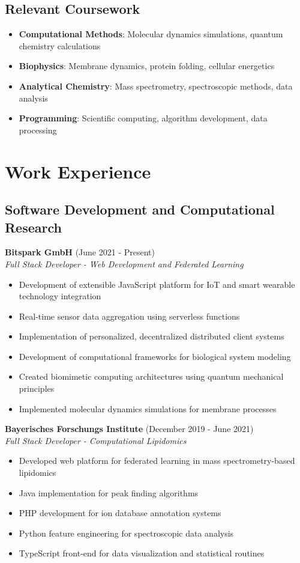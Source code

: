\documentclass[11pt,a4paper]{article}
\begin{document}
\subsection{Relevant Coursework}
\begin{itemize}[leftmargin=*,itemsep=0.1em]
\item \textbf{Computational Methods}: Molecular dynamics simulations, quantum chemistry calculations
\item \textbf{Biophysics}: Membrane dynamics, protein folding, cellular energetics
\item \textbf{Analytical Chemistry}: Mass spectrometry, spectroscopic methods, data analysis
\item \textbf{Programming}: Scientific computing, algorithm development, data processing
\end{itemize}

\section{Work Experience}

\subsection{Software Development and Computational Research}

\textbf{Bitspark GmbH} (June 2021 - Present)\\
\textit{Full Stack Developer - Web Development and Federated Learning}
\begin{itemize}[leftmargin=*,itemsep=0.1em]
\item Development of extensible JavaScript platform for IoT and smart wearable technology integration
\item Real-time sensor data aggregation using serverless functions
\item Implementation of personalized, decentralized distributed client systems
\item Development of computational frameworks for biological system modeling
\item Created biomimetic computing architectures using quantum mechanical principles
\item Implemented molecular dynamics simulations for membrane processes
\end{itemize}

\textbf{Bayerisches Forschungs Institute} (December 2019 - June 2021)\\
\textit{Full Stack Developer - Computational Lipidomics}
\begin{itemize}[leftmargin=*,itemsep=0.1em]
\item Developed web platform for federated learning in mass spectrometry-based lipidomics
\item Java implementation for peak finding algorithms
\item PHP development for ion database annotation systems
\item Python feature engineering for spectroscopic data analysis
\item TypeScript front-end for data visualization and statistical routines
\end{itemize}
\end{document}
